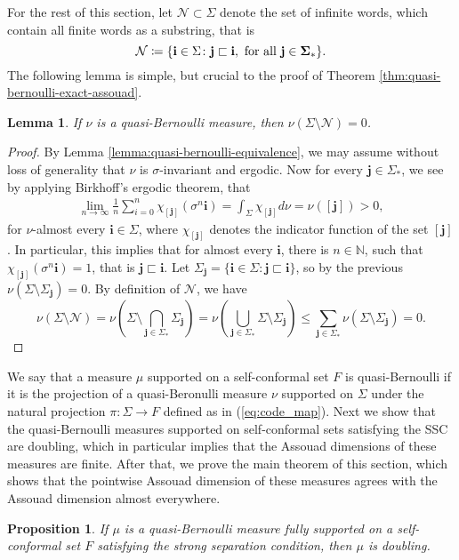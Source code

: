 \documentclass{PRM}
\newcommand{\field}[1]{\mathbb{#1}}
\newcommand{\N}{\field{N}}
\theoremstyle{plain}
\newtheorem{lemma}[thm]{Lemma}
\newtheorem{prop}[thm]{Proposition}
\theoremstyle{definition}
\theoremstyle{remark}
\begin{document}
For the rest of this section, let $\mathcal{N}\subset \Sigma$ denote the set of infinite words, which contain all finite words as a substring, that is 
\begin{equation*}
    \mathcal{N}\coloneqq \{\mathbf{i}\in\Sigma\colon \mathbf{j}\sqsubset \mathbf{i},\textnormal{ for all }\mathbf{j\in\Sigma_*}\}.
\end{equation*}
The following lemma is simple, but crucial to the proof of Theorem \ref{thm:quasi-bernoulli-exact-assouad}.

\begin{lemma}\label{lemma:quasi-normal}
If $\nu$ is a quasi-Bernoulli measure, then $\nu(\Sigma\setminus\mathcal{N})=0$.
\end{lemma}
\begin{proof}
By Lemma \ref{lemma:quasi-bernoulli-equivalence}, we may assume without loss of generality that $\nu$ is $\sigma$-invariant and ergodic. Now for every $\mathbf{j}\in\Sigma_*$, we see by applying Birkhoff's ergodic theorem, that
\begin{align*}
    \lim_{n\to\infty}\frac{1}{n}\sum_{i=0}^{n}\chi_{[\mathbf{j}]}(\sigma^n\mathbf{i})=\int_{\Sigma}\chi_{[\mathbf{j}]}d\nu = \nu([\mathbf{j}])>0,
\end{align*}
for $\nu$-almost every $\mathbf{i}\in\Sigma$, where $\chi_{[\mathbf{j}]}$ denotes the indicator function of the set $[\mathbf{j}]$. In particular, this implies that for almost every $\mathbf{i}$, there is $n\in\N$, such that $\chi_{[\mathbf{j}]}(\sigma^n\mathbf{i})=1$, that is $\mathbf{j}\sqsubset\mathbf{i}$. Let $\Sigma_{\mathbf{j}}=\{\mathbf{i}\in\Sigma\colon \mathbf{j}\sqsubset\mathbf{i}\}$, so by the previous $\nu(\Sigma\setminus\Sigma_{\mathbf{j}})=0$. By definition of $\mathcal{N}$, we have
\begin{equation*}
    \nu(\Sigma\setminus\mathcal{N})=\nu\left(\Sigma\setminus\bigcap_{\mathbf{j}\in\Sigma_*}\Sigma_{\mathbf{j}}\right)=\nu\left(\bigcup_{\mathbf{j}\in\Sigma_*}\Sigma\setminus\Sigma_{\mathbf{j}}\right)\leq \sum_{\mathbf{j}\in\Sigma_*}\nu(\Sigma\setminus\Sigma_{\mathbf{j}})=0.
\end{equation*}
\end{proof}
We say that a measure $\mu$ supported on a self-conformal set $F$ is quasi-Bernoulli if it is the projection of a quasi-Beronulli measure $\nu$ supported on $\Sigma$ under the natural projection $\pi\colon\Sigma\to F$ defined as in (\ref{eq:code_map}). Next we show that the quasi-Bernoulli measures supported on self-conformal sets satisfying the SSC are doubling, which in particular implies that the Assouad dimensions of these measures are finite. After that, we prove the main theorem of this section, which shows that the pointwise Assouad dimension of these measures agrees with the Assouad dimension almost everywhere.
\begin{prop}\label{prop:doubling}
If $\mu$ is a quasi-Bernoulli measure fully supported on a self-conformal set $F$ satisfying the strong separation condition, then $\mu$ is doubling.
\end{prop}
\end{document}

